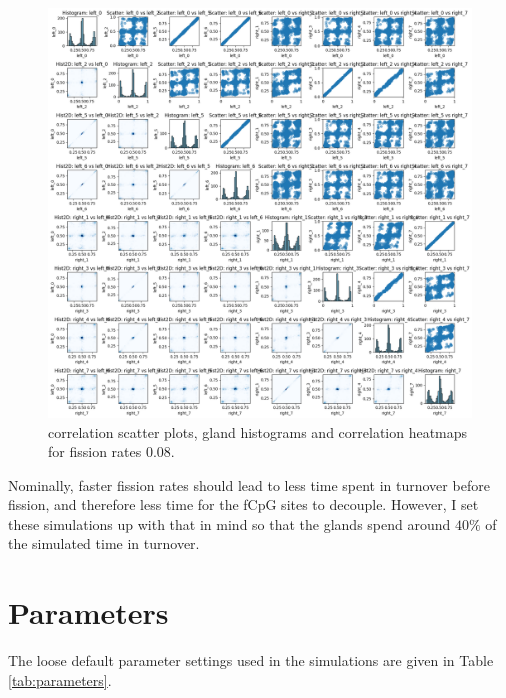 \begin{figure}[h]
    \centering
    \includegraphics[width=\textwidth]{Chapter_5/figures/sensitivity_migrate2.png}
    \caption{correlation scatter plots, gland histograms and correlation heatmaps for fission rates $0.08$.}
    \label{fig:sensitivity_migrate2}
\end{figure}
\clearpage
Nominally, faster fission rates should lead to less time spent in turnover before fission, and therefore less time for the fCpG sites to decouple. However, I set these simulations up with that in mind so that the glands spend around $40\%$ of the simulated time in turnover.

\section{Parameters}
The loose default parameter settings used in the simulations are given in Table \ref{tab:parameters}.

